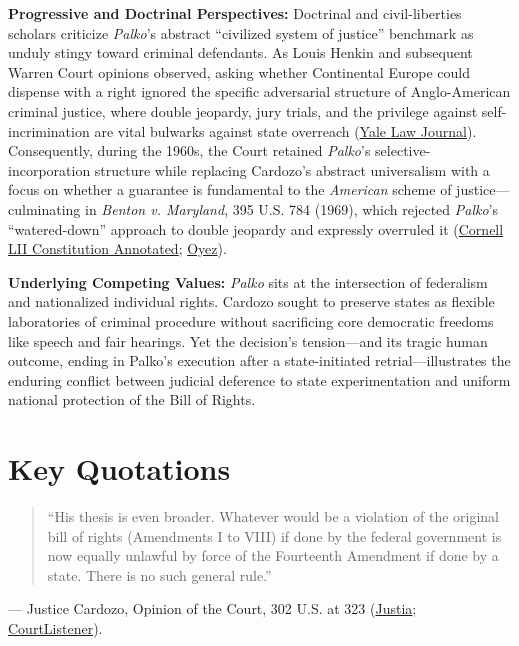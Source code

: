 \documentclass[12pt]{article}
\begin{document}
\textbf{Progressive and Doctrinal Perspectives:} Doctrinal and civil-liberties scholars criticize \textit{Palko}'s abstract ``civilized system of justice'' benchmark as unduly stingy toward criminal defendants. As Louis Henkin and subsequent Warren Court opinions observed, asking whether Continental Europe could dispense with a right ignored the specific adversarial structure of Anglo-American criminal justice, where double jeopardy, jury trials, and the privilege against self-incrimination are vital bulwarks against state overreach (\href{https://openyls.law.yale.edu/server/api/core/bitstreams/8b7df10e-f7aa-4233-ba2b-2ca63a92071a/content}{Yale Law Journal}). Consequently, during the 1960s, the Court retained \textit{Palko}'s selective-incorporation structure while replacing Cardozo's abstract universalism with a focus on whether a guarantee is fundamental to the \textit{American} scheme of justice---culminating in \textit{Benton v. Maryland}, 395 U.S. 784 (1969), which rejected \textit{Palko}'s ``watered-down'' approach to double jeopardy and expressly overruled it (\href{https://www.law.cornell.edu/constitution-conan/amendment-14/modern-doctrine-on-selective-incorporation-of-bill-of-rights}{Cornell LII Constitution Annotated}; \href{https://www.oyez.org/cases/1900-1940/302us319}{Oyez}).

\textbf{Underlying Competing Values:} \textit{Palko} sits at the intersection of federalism and nationalized individual rights. Cardozo sought to preserve states as flexible laboratories of criminal procedure without sacrificing core democratic freedoms like speech and fair hearings. Yet the decision's tension---and its tragic human outcome, ending in Palko's execution after a state-initiated retrial---illustrates the enduring conflict between judicial deference to state experimentation and uniform national protection of the Bill of Rights.

\section{Key Quotations}

\begin{quote}
``His thesis is even broader. Whatever would be a violation of the original bill of rights (Amendments I to VIII) if done by the federal government is now equally unlawful by force of the Fourteenth Amendment if done by a state. There is no such general rule.''
\end{quote}
\noindent --- Justice Cardozo, Opinion of the Court, 302 U.S. at 323 (\href{https://supreme.justia.com/cases/federal/us/302/319/}{Justia}; \href{https://www.courtlistener.com/opinion/102879/palko-v-connecticut/}{CourtListener}).
\end{document}
